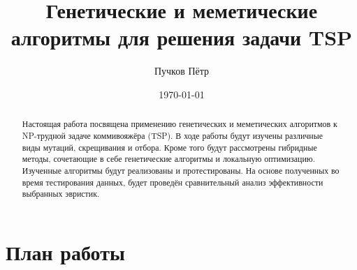 \documentclass[a4paper,12pt]{article}
\begin{document}
\title{Генетические и меметические алгоритмы для решения задачи TSP}
\author{Пучков Пётр}
\date{\today}
\maketitle

\begin{abstract}
Настоящая работа посвящена применению генетических и меметических алгоритмов к NP-трудной задаче коммивояжёра (TSP). В ходе работы будут изучены различные виды мутаций, скрещивания и отбора. Кроме того будут рассмотрены гибридные методы, сочетающие в себе генетические алгоритмы и локальную оптимизацию. Изученные алгоритмы будут реализованы и протестированы. На основе полученных во время тестирования данных, будет проведён сравнительный анализ эффективности выбранных эвристик.

\end{abstract}

\pagebreak

\section{План работы}
\end{document}
